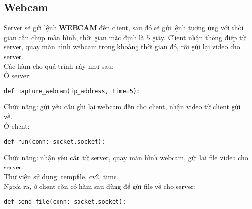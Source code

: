 \subsection{Webcam}
Server sẽ gửi lệnh \textbf{WEBCAM} đến client, sau đó sẽ gửi lệnh tương ứng với thời gian cần chụp màn hình, thời gian mặc định là $5$ giây. Client nhận thông điệp từ server, quay màn hình webcam trong khoảng thời gian đó, rồi gửi lại video cho server.\\
Các hàm cho quá trình này như sau:\\
Ở server:
\begin{lstlisting}
def capture_webcam(ip_address, time=5):
\end{lstlisting}
Chức năng: gửi yêu cầu ghi lại webcam đến cho client, nhận video từ client gửi về.\\
Ở client:
\begin{lstlisting}
def run(conn: socket.socket):
\end{lstlisting}
Chức năng: nhận yêu cầu từ server, quay màn hình webcam, gửi lại file video cho server.\\
Thư viện sử dụng: tempfile, cv2, time.\\
Ngoài ra, ở client còn có hàm sau dùng để gửi file về cho server:
\begin{lstlisting}
def send_file(conn: socket.socket):
\end{lstlisting}